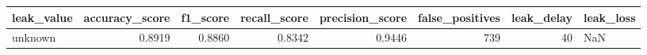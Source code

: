 \begin{tabular}{lrrrrrrl}
\toprule
leak\_value & accuracy\_score & f1\_score & recall\_score & precision\_score & false\_positives & leak\_delay & leak\_loss \\
\midrule
unknown & 0.8919 & 0.8860 & 0.8342 & 0.9446 & 739 & 40 & NaN \\
\bottomrule
\end{tabular}

